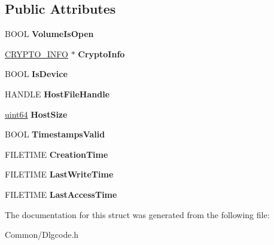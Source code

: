 \subsection*{Public Attributes}
\begin{DoxyCompactItemize}
\item 
\mbox{\label{struct_open_volume_context_abb17fe49b1054be21b1c9e1818f3f7ed}} 
B\+O\+OL {\bfseries Volume\+Is\+Open}
\item 
\mbox{\label{struct_open_volume_context_aceab2784bfc713006dd1b81da225925a}} 
\hyperlink{struct_c_r_y_p_t_o___i_n_f_o__t}{C\+R\+Y\+P\+T\+O\+\_\+\+I\+N\+FO} $\ast$ {\bfseries Crypto\+Info}
\item 
\mbox{\label{struct_open_volume_context_a9706cf07093e584933c02b1d966ec251}} 
B\+O\+OL {\bfseries Is\+Device}
\item 
\mbox{\label{struct_open_volume_context_a5e28cca2f16a5c881ae27f95e96ad46b}} 
H\+A\+N\+D\+LE {\bfseries Host\+File\+Handle}
\item 
\mbox{\label{struct_open_volume_context_a3ea9640eedbf1d09caebe4f487df0f75}} 
\hyperlink{union_u_i_n_t64___s_t_r_u_c_t}{uint64} {\bfseries Host\+Size}
\item 
\mbox{\label{struct_open_volume_context_a41997a1ffeb41c8b432574888bc77b27}} 
B\+O\+OL {\bfseries Timestamps\+Valid}
\item 
\mbox{\label{struct_open_volume_context_a42c67cffe8ecced216ebd5382c9bb98f}} 
F\+I\+L\+E\+T\+I\+ME {\bfseries Creation\+Time}
\item 
\mbox{\label{struct_open_volume_context_a6f24fee9bbbb80d6f41ab6af7448aef8}} 
F\+I\+L\+E\+T\+I\+ME {\bfseries Last\+Write\+Time}
\item 
\mbox{\label{struct_open_volume_context_aea399e4aa548b5ff62fca66e1f07ace4}} 
F\+I\+L\+E\+T\+I\+ME {\bfseries Last\+Access\+Time}
\end{DoxyCompactItemize}


The documentation for this struct was generated from the following file\+:\begin{DoxyCompactItemize}
\item 
Common/Dlgcode.\+h\end{DoxyCompactItemize}
